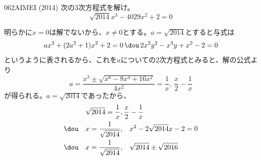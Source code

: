 \begin{prob}{062}{}{AIMEI (2014)}
 次の3次方程式を解け。\\
 \[ \sqrt{2014}x^3-4029x^2+2=0 \]
\end{prob}

明らかに$x=0$は解でないから、$x\neq 0$とする。$a=\sqrt{2014}$とすると与式は
\[ ax^3+(2a^2+1)x^2+2=0 \,\dou\, 2x^2y^2-x^3y+x^2-2=0 \]
というように表されるから、これを$a$についての2次方程式とみると、解の公式より
\[ a=\frac{x^3\pm\sqrt{x^6-8x^4+16x^2}}{4x^2}=\frac{1}{x},\, \frac{x}{2}-\frac{1}{x} \]
が得られる。$a=\sqrt{2014}$であったから、
\begin{align*}
 \sqrt{2014}=\frac{1}{x},&\, \frac{x}{2}-\frac{1}{x} \\
 \dou\quad x=\frac{1}{\sqrt{2014}},&\quad x^2-2\sqrt{2014}x-2=0 \\
 \dou\quad x=\frac{1}{\sqrt{2014}},&\quad \sqrt{2014}\pm\sqrt{2016}
\end{align*}